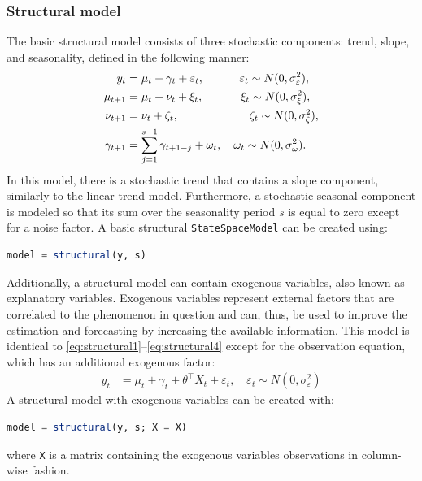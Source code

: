 \documentclass{juliacon}
\begin{document}
\subsubsection{Structural model}

The basic structural model consists of three stochastic components: trend, slope, and seasonality, defined in the following manner:
%
\begin{align}
    y_{t} &= \mu_{t} + \gamma_{t} + \varepsilon_{t}, \hspace{0.09\columnwidth} \varepsilon_{t} \sim N(0, \sigma^{2}_\varepsilon), \label{eq:structural1} \\
    \mu_{t+1} &= \mu_{t} + \nu_{t} + \xi_{t}, \hspace{0.095\columnwidth} \xi_{t} \sim N(0, \sigma^{2}_\xi), \label{eq:structural2} \\
    \nu_{t+1} &= \nu_{t} + \zeta_{t}, \hspace{0.18\columnwidth} \zeta_{t} \sim N(0, \sigma^{2}_\zeta), \label{eq:structural3} \\
    \gamma_{t+1} &= \sum_{j=1}^{s-1} \gamma_{t+1-j} + \omega_{t}, \quad \omega_{t} \sim N(0, \sigma^{2}_\omega). \label{eq:structural4}
\end{align}
%
In this model, there is a stochastic trend that contains a slope component, similarly to the linear trend model. Furthermore, a stochastic seasonal component is modeled so that its sum over the seasonality period $s$ is equal to zero except for a noise factor. A basic structural \texttt{StateSpaceModel} can be created using:
%
\begin{lstlisting}[language = Julia]
model = structural(y, s)
\end{lstlisting}

Additionally, a structural model can contain exogenous variables, also known as explanatory variables. Exogenous variables represent external factors that are correlated to the phenomenon in question and can, thus, be used to improve the estimation and forecasting by increasing the available information. This model is identical to \eqref{eq:structural1}--\eqref{eq:structural4} except for the observation equation, which has an additional exogenous factor:
%
\begin{align}
    y_{t} &= \mu_{t} + \gamma_{t} + \theta^{\top} X_{t} + \varepsilon_{t}, \quad \varepsilon_{t} \sim N(0, \sigma^{2}_\varepsilon) \label{eq:structural_exogenous}
\end{align}
%
A structural model with exogenous variables can be created with:
%
\begin{lstlisting}[language = Julia]
model = structural(y, s; X = X)
\end{lstlisting}
%
\noindent where \texttt{X} is a matrix containing the exogenous variables observations in column-wise fashion.
\end{document}
